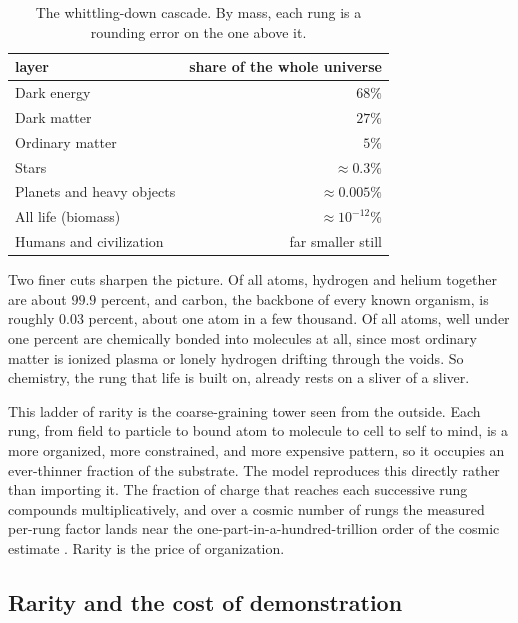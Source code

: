 \begin{table}[h]
\centering
\begin{tabular}{lr}
\toprule
layer & share of the whole universe \\
\midrule
Dark energy & $68\%$ \\
Dark matter & $27\%$ \\
Ordinary matter & $5\%$ \\
\quad Stars & $\approx 0.3\%$ \\
\quad Planets and heavy objects & $\approx 0.005\%$ \\
\quad\quad All life (biomass) & $\approx 10^{-12}\%$ \\
\quad\quad Humans and civilization & far smaller still \\
\bottomrule
\end{tabular}
\caption{The whittling-down cascade. By mass, each rung is a rounding error on the one above it.}
\label{tab:rarity-cascade}
\end{table}

Two finer cuts sharpen the picture. Of all atoms, hydrogen and helium together are about $99.9$ percent, and carbon, the backbone of every known organism, is roughly $0.03$ percent, about one atom in a few thousand. Of all atoms, well under one percent are chemically bonded into molecules at all, since most ordinary matter is ionized plasma or lonely hydrogen drifting through the voids. So chemistry, the rung that life is built on, already rests on a sliver of a sliver.

This ladder of rarity is the coarse-graining tower seen from the outside. Each rung, from field to particle to bound atom to molecule to cell to self to mind, is a more organized, more constrained, and more expensive pattern, so it occupies an ever-thinner fraction of the substrate. The model reproduces this directly rather than importing it. The fraction of charge that reaches each successive rung compounds multiplicatively, and over a cosmic number of rungs the measured per-rung factor lands near the one-part-in-a-hundred-trillion order of the cosmic estimate \cite{pollard2026vibetest}. Rarity is the price of organization.

\subsection{Rarity and the cost of demonstration}

